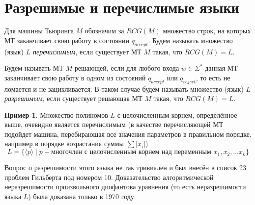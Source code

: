 \documentclass[
    11pt,
    a4paper
]{article}
\theoremstyle{definition}
\newtheorem{example}[theorem]{Пример}
\begin{document}
\section{Разрешимые и перечислимые языки}

Для машины Тьюринга $M$ обозначим за $RCG(M)$ множество строк, на которых МТ заканчивает свою работу в состоянии $q_{accept}$. Будем называть множество (язык) $L$ \textit{перечислимым}, если существует МТ $M$ такая, что $RCG(M) = L$.

Будем называть МТ $M$ решающей, если для любого входа $w \in \Sigma^*$ данная МТ заканчивает свою работу в одном из состояний $q_{accept}$ или $q_{reject}$, то есть не ломается и не зацикливается. В таком случае будем называть множество (язык) $L$ \textit{разрешимым}, если существует решающая МТ $M$ такая, что $RCG(M) = L$.

\begin{example}
Множество полиномов $L$ с целочисленным корнем, определённое выше, очевидно является перечислимым (в качестве перечисляющей МТ подойдет машина, перебирающая все значения параметров в правильном порядке, например в порядке возрастания суммы $\sum |x_i|$) $$L = \{ \langle p \rangle \mid p - \textit{многочлен с целочисленным корнем над переменным } x_1, x_2, \dots x_k \}$$

Вопрос о разрешимости этого языка не так тривиален и был внесён в список 23 проблем Гильберта под номером 10. Доказательство алгоритмической неразрешимости произвольного диофантова уравнения (то есть неразрешимости языка $L$) была доказана только в 1970 году.
\end{example}
\end{document}
